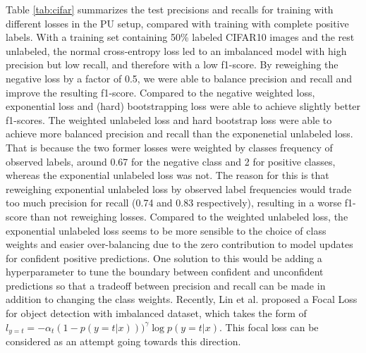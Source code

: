 Table \ref{tab:cifar} summarizes the test precisions and recalls for training with different losses in the PU setup, compared with training with complete positive labels.
With a training set containing 50\% labeled CIFAR10 images and the rest unlabeled, the normal cross-entropy loss led to an imbalanced model with high precision but low recall, and therefore with a low f1-score.
By reweighing the negative loss by a factor of 0.5, we were able to balance precision and recall and improve the resulting f1-score.
Compared to the negative weighted loss, exponential loss and (hard) bootstrapping loss were able to achieve slightly better f1-scores.
The weighted unlabeled loss and hard bootstrap loss were able to achieve more balanced precision and recall than the exponenetial unlabeled loss.
That is because the two former losses were weighted by classes frequency of observed labels, around 0.67 for the negative class and 2 for positive classes, whereas the exponential unlabeled loss was not.
The reason for this is that reweighing exponential unlabeled loss by observed label frequencies would trade too much precision for recall (0.74 and 0.83 respectively), resulting in a worse f1-score than not reweighing losses.
Compared to the weighted unlabeled loss, the exponential unlabeled loss seems to be more sensible to the choice of class weights and easier over-balancing due to the zero contribution to model updates for confident positive predictions.
One solution to this would be adding a hyperparameter to tune the boundary between confident and unconfident predictions so that a tradeoff between precision and recall can be made in addition to changing the class weights.
Recently, Lin et al. \cite{lin2017focal} proposed a Focal Loss\cite{lin2017focal} for object detection with imbalanced dataset, which takes the form of $l_{y=t} = - \alpha_t (1-p(y=t \vert x)))^{\gamma} \log p(y=t \vert x)$.
This focal loss can be considered as an attempt going towards this direction.


